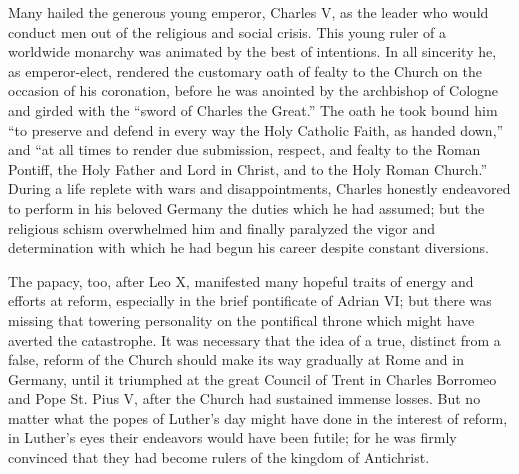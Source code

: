 Many hailed the generous young emperor, Charles V, as the leader
who would conduct men out of the religious and social crisis. This
young ruler of a worldwide monarchy was animated by the best
of intentions. In all sincerity he, as emperor-elect, rendered the customary
oath of fealty to the Church on the occasion of his coronation, before
he was anointed by the archbishop of Cologne and girded
with the “sword of Charles the Great.” The oath he took bound
him “to preserve and defend in every way the Holy Catholic Faith,
as handed down,” and “at all times to render due submission, respect,
and fealty to the Roman Pontiff, the Holy Father and Lord in Christ,
and to the Holy Roman Church.” During a life replete with wars
and disappointments, Charles honestly endeavored to perform in
his beloved Germany the duties which he had assumed; but the religious
schism overwhelmed him and finally paralyzed the vigor and
determination with which he had begun his career despite constant
diversions.

The papacy, too, after Leo X, manifested many hopeful traits of
energy and efforts at reform, especially in the brief pontificate of
Adrian VI; but there was missing that towering personality on the
pontifical throne which might have averted the catastrophe. It was
necessary that the idea of a true, distinct from a false, reform of the
Church should make its way gradually at Rome and in Germany,
until it triumphed at the great Council of Trent in Charles Borromeo
and Pope St. Pius V, after the Church had sustained immense losses.
But no matter what the popes of Luther’s day might have done in
the interest of reform, in Luther’s eyes their endeavors would have
been futile; for he was firmly convinced that they had become
rulers of the kingdom of Antichrist.
